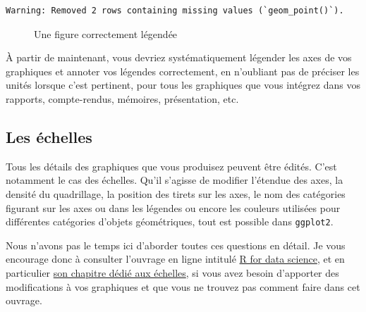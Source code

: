 \documentclass[
  a4paper,
  DIV=11,
  numbers=noendperiod,
  oneside]{scrreprt}
\begin{document}
\begin{verbatim}
Warning: Removed 2 rows containing missing values (`geom_point()`).
\end{verbatim}

\begin{figure}[H]


\caption{\label{fig-label}Une figure correctement légendée}

\end{figure}%

À partir de maintenant, vous devriez systématiquement légender les axes
de vos graphiques et annoter vos légendes correctement, en n'oubliant
pas de préciser les unités lorsque c'est pertinent, pour tous les
graphiques que vous intégrez dans vos rapports, compte-rendus, mémoires,
présentation, etc.

\subsection{Les échelles}\label{les-uxe9chelles}

Tous les détails des graphiques que vous produisez peuvent être édités.
C'est notamment le cas des échelles. Qu'il s'agisse de modifier
l'étendue des axes, la densité du quadrillage, la position des tirets
sur les axes, le nom des catégories figurant sur les axes ou dans les
légendes ou encore les couleurs utilisées pour différentes catégories
d'objets géométriques, tout est possible dans \texttt{ggplot2}.

Nous n'avons pas le temps ici d'aborder toutes ces questions en détail.
Je vous encourage donc à consulter l'ouvrage en ligne intitulé
\href{http://r4ds.had.co.nz/}{R for data science}, et en particulier
\href{http://r4ds.had.co.nz/graphics-for-communication.html\#scales}{son
chapitre dédié aux échelles}, si vous avez besoin d'apporter des
modifications à vos graphiques et que vous ne trouvez pas comment faire
dans cet ouvrage.
\end{document}
